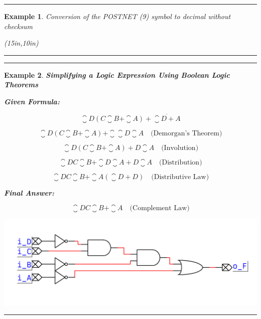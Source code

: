 \documentclass[12pt]{article}
\newtheorem{example}{Example}
\newenvironment{examp}
{\vspace{0.5cm}
\hrule
\begin{example}}
{\hrule
\vspace{0.5cm}
\end{example}}
\begin{document}
\newpage
\begin{examp}
	Conversion of the POSTNET (9) symbol to decimal without checksum
	\begin{center}
		\begin{pspicture}(15in,10in)
		\end{pspicture}
	\end{center}
\end{examp}

\begin{examp}
	\textbf{Simplifying a Logic Expression Using Boolean Logic Theorems}

	\textbf{Given Formula:}

	\[ \closure{D}(C\closure{B} + \closure{A}) + \overline{\closure{D} + A} \]

	\[ \closure{D}(C\closure{B} + \closure{A}) + \closure{\closure{D}}\closure{A} \quad \text{(Demorgan's Theorem)}\]

	\[ \closure{D}(C\closure{B} + \closure{A}) + D\closure{A}  \quad \text{(Involution)}\]

	\[ \closure{D}C\closure{B} +\closure{D}\closure{A} + D\closure{A}  \quad \text{(Distribution)}\]

	\[ \closure{D}C\closure{B} +\closure{A}(\closure{D}+ D) \quad \text{(Distributive Law)}\]

	\textbf{Final Answer:}

	\[ \closure{D}C\closure{B} +\closure{A} \quad \text{(Complement Law)}\]
	\begin{center}
		\includegraphics[scale=0.3]{lab043}
	\end{center}

\end{examp}
\end{document}
